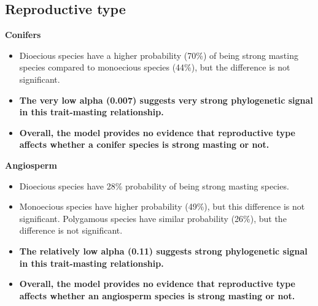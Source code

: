 \documentclass{article}
\begin{document}
\subsection{Reproductive type}
\textbf{Conifers}\\
\begin{itemize}
\item Dioecious species have a higher probability (70\%) of being strong masting species compared to monoecious species (44\%), but the difference is not significant.
\item \textbf{The very low alpha (0.007) suggests very strong phylogenetic signal in this trait-masting relationship.}
\item \textbf{Overall, the model provides no evidence that reproductive type affects whether a conifer species is strong masting or not.}
\end{itemize}
\textbf{Angiosperm}\\
\begin{itemize}
\item Dioecious species have 28\% probability of being strong masting species.
\item Monoecious species have higher probability (49\%), but this difference is not significant. Polygamous species have similar probability (26\%), but the difference is not significant.
\item \textbf{The relatively low alpha (0.11) suggests strong phylogenetic signal in this trait-masting relationship.}
\item \textbf{Overall, the model provides no evidence that reproductive type affects whether an angiosperm species is strong masting or not.}
\end{itemize}
\end{document}
